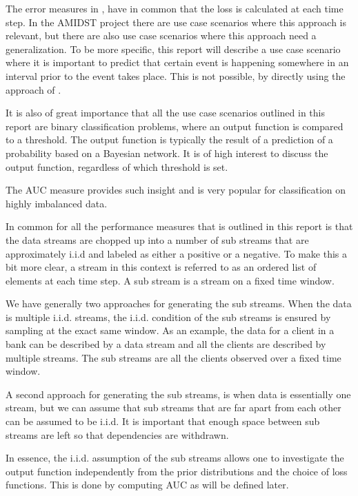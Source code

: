 The error measures in \cite{Gam13}, have in common that the loss is calculated at each time step. In the AMIDST project there are use case scenarios where this approach is relevant, but there are also use case scenarios where this approach need a generalization.  To be more specific, this report will describe a use case scenario where it is important to predict that certain event is happening somewhere in an interval prior to the event takes place.  This is not possible, by directly using the approach of \cite{Gam13}.  

It is also of great importance that all the use case scenarios outlined in this report are binary classification problems, where an output function is compared to a threshold.  The output function is typically the result of a prediction of a probability based  on a Bayesian network.  It is of high interest to discuss the output function, regardless of which threshold is set.  

The AUC measure provides such insight and is very popular for classification on highly imbalanced data. 


In common for all the performance measures that is outlined in this report is that the data streams are chopped up into a number of sub streams that are approximately i.i.d and labeled as either a positive or a negative.  To make this a bit more clear, a stream in this context is referred to as an ordered list of elements at each time step.  A sub stream is a stream on a fixed time window.

We have generally two approaches for generating the sub streams.  When the data is multiple i.i.d. streams, the i.i.d. condition of the sub streams is ensured by sampling at the exact same window.  As an example, the data for a client in a bank can be described by a data stream and all the clients are described by multiple streams.  The sub streams are all the clients observed over a fixed time window.

A second approach for generating the sub streams, is when data is essentially one stream, but we can assume that sub streams that are far apart from each other can be assumed to be i.i.d. It is important that enough space between sub streams are left so that dependencies are withdrawn.

In essence, the i.i.d. assumption of the sub streams allows one to investigate the output function independently from the prior distributions and the choice of loss functions.  This is done by computing AUC as will be defined later. 


